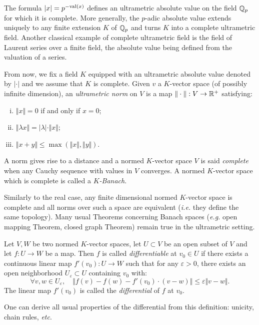 \documentclass{lms}
\begin{document}
The formula $|x| = p^{-\text{\rm val}(x)}$ defines an ultrametric absolute value on 
the field $\mathbb Q_p$ for which it is complete. More generally, the $p$-adic 
absolute value extends uniquely to any finite extension $K$ of $\mathbb Q_p$ and 
turns $K$ into a complete ultrametric field. Another classical example of 
complete ultrametric field is the field of Laurent series over a finite
field, the absolute value being defined from the valuation of a series.

From now, we fix a field $K$ equipped with an ultrametric absolute value 
denoted by $|\cdot|$ and we assume that $K$ is complete. Given $v$ a 
$K$-vector space (of possibly infinite dimension), an \emph{ultrametric 
norm} on $V$ is a map $\Vert\cdot\Vert : V \to \mathbb R^+$ satisfying:
\begin{enumerate}[(i)]
\item $\Vert x\Vert = 0$ if and only if $x = 0$;
\item $\Vert \lambda x\Vert = |\lambda| \cdot \Vert x\Vert$;
\item $\Vert x+y\Vert \leq \max(\Vert x\Vert, \Vert y\Vert)$.
\end{enumerate}
A norm gives rise to a distance and a normed $K$-vector space $V$ is 
said \emph{complete} when any Cauchy sequence with values in $V$ 
converges. A normed $K$-vector space which is complete is called a 
\emph{$K$-Banach}.

Similarly to the real case, any finite dimensional normed $K$-vector 
space is complete and all norms over such a space are equivalent 
(\emph{i.e.} they define the same topology). Many usual Theorems 
concerning Banach spaces (\emph{e.g.} open mapping Theorem, closed graph 
Theorem) remain true in the ultrametric setting.

\begin{deftn} \label{deftn : diff}
Let $V, W$ be two normed $K$-vector spaces, let $U \subset V$ be an open 
subset of $V$ and let $f : U \rightarrow W$ be a map. Then $f$ is called 
\emph{differentiable} at $v_0 \in U$ if there exists a 
continuous linear map $f'(v_0) : U \rightarrow W$ such that for any 
$\varepsilon >0$, there exists an open neighborhood $U_\varepsilon 
\subset U$ containing $v_0$ with:
\[ 
\forall v, w \in U_\varepsilon, \quad
\Vert f(v)-f(w)-f'(v_0) \cdot \left( v-w \right) \Vert 
\leq \varepsilon \Vert v-w \Vert. 
\]
The linear map $f'(v_0)$ is called the \emph{differential} of $f$ at $v_0$.
\end{deftn}

One can derive all usual properties of the differential from this 
definition: unicity, chain rules, \emph{etc}.
\end{document}
